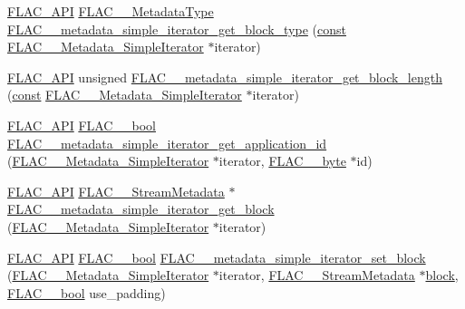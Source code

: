 \begin{DoxyCompactItemize}
\item 
\hyperlink{group__flac__export_ga56ca07df8a23310707732b1c0007d6f5}{F\+L\+A\+C\+\_\+\+A\+PI} \hyperlink{group__flac__format_gac71714ba8ddbbd66d26bb78a427fac01}{F\+L\+A\+C\+\_\+\+\_\+\+Metadata\+Type} \hyperlink{group__flac__metadata__level1_ga4649a49d230ac8bfc3ec88f5196205bb}{F\+L\+A\+C\+\_\+\+\_\+metadata\+\_\+simple\+\_\+iterator\+\_\+get\+\_\+block\+\_\+type} (\hyperlink{getopt1_8c_a2c212835823e3c54a8ab6d95c652660e}{const} \hyperlink{struct_f_l_a_c_____metadata___simple_iterator}{F\+L\+A\+C\+\_\+\+\_\+\+Metadata\+\_\+\+Simple\+Iterator} $\ast$iterator)
\item 
\hyperlink{group__flac__export_ga56ca07df8a23310707732b1c0007d6f5}{F\+L\+A\+C\+\_\+\+A\+PI} unsigned \hyperlink{group__flac__metadata__level1_gaad69b5d6c58c48e08dcfb3f1018c2602}{F\+L\+A\+C\+\_\+\+\_\+metadata\+\_\+simple\+\_\+iterator\+\_\+get\+\_\+block\+\_\+length} (\hyperlink{getopt1_8c_a2c212835823e3c54a8ab6d95c652660e}{const} \hyperlink{struct_f_l_a_c_____metadata___simple_iterator}{F\+L\+A\+C\+\_\+\+\_\+\+Metadata\+\_\+\+Simple\+Iterator} $\ast$iterator)
\item 
\hyperlink{group__flac__export_ga56ca07df8a23310707732b1c0007d6f5}{F\+L\+A\+C\+\_\+\+A\+PI} \hyperlink{ordinals_8h_a95103469f1cbd78b8cf250194985b34e}{F\+L\+A\+C\+\_\+\+\_\+bool} \hyperlink{group__flac__metadata__level1_gaf2db2a96f7c60100d620a2eefb8360bc}{F\+L\+A\+C\+\_\+\+\_\+metadata\+\_\+simple\+\_\+iterator\+\_\+get\+\_\+application\+\_\+id} (\hyperlink{struct_f_l_a_c_____metadata___simple_iterator}{F\+L\+A\+C\+\_\+\+\_\+\+Metadata\+\_\+\+Simple\+Iterator} $\ast$iterator, \hyperlink{ordinals_8h_a5eb569b12d5b047cdacada4d57924ee3}{F\+L\+A\+C\+\_\+\+\_\+byte} $\ast$id)
\item 
\hyperlink{group__flac__export_ga56ca07df8a23310707732b1c0007d6f5}{F\+L\+A\+C\+\_\+\+A\+PI} \hyperlink{struct_f_l_a_c_____stream_metadata}{F\+L\+A\+C\+\_\+\+\_\+\+Stream\+Metadata} $\ast$ \hyperlink{group__flac__metadata__level1_ga31c9e013b3bdc04866eee2271349fe60}{F\+L\+A\+C\+\_\+\+\_\+metadata\+\_\+simple\+\_\+iterator\+\_\+get\+\_\+block} (\hyperlink{struct_f_l_a_c_____metadata___simple_iterator}{F\+L\+A\+C\+\_\+\+\_\+\+Metadata\+\_\+\+Simple\+Iterator} $\ast$iterator)
\item 
\hyperlink{group__flac__export_ga56ca07df8a23310707732b1c0007d6f5}{F\+L\+A\+C\+\_\+\+A\+PI} \hyperlink{ordinals_8h_a95103469f1cbd78b8cf250194985b34e}{F\+L\+A\+C\+\_\+\+\_\+bool} \hyperlink{group__flac__metadata__level1_ga7d1ceb2db292c968ae6ac18ecb15c356}{F\+L\+A\+C\+\_\+\+\_\+metadata\+\_\+simple\+\_\+iterator\+\_\+set\+\_\+block} (\hyperlink{struct_f_l_a_c_____metadata___simple_iterator}{F\+L\+A\+C\+\_\+\+\_\+\+Metadata\+\_\+\+Simple\+Iterator} $\ast$iterator, \hyperlink{struct_f_l_a_c_____stream_metadata}{F\+L\+A\+C\+\_\+\+\_\+\+Stream\+Metadata} $\ast$\hyperlink{structblock}{block}, \hyperlink{ordinals_8h_a95103469f1cbd78b8cf250194985b34e}{F\+L\+A\+C\+\_\+\+\_\+bool} use\+\_\+padding)

\end{DoxyCompactItemize}
